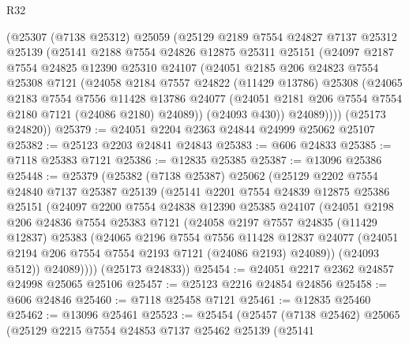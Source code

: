 \begin{lexlean}{R32}
\begin{coremodule}
    (@25307
      (@7138 @25312)
      @25059
      (@25129
        @2189
        @7554
        @24827
        @7137
        @25312
        @25139
        (@25141
          @2188
          @7554
          @24826
          @12875
          @25311
          @25151
          (@24097
            @2187
            @7554
            @24825
            @12390
            @25310
            @24107
            (@24051
              @2185
              @206
              @24823
              @7554
              @25308
              @7121
              (@24058
                @2184
                @7557
                @24822
                (@11429 @13786)
                @25308
                (@24065
                  @2183
                  @7554
                  @7556
                  @11428
                  @13786
                  @24077
                  (@24051 @2181 @206 @7554 @7554 @2180 @7121 (@24086 @2180) @24089))
                (@24093 @430))
              @24089))))
      (@25173 @24820))
@25379 := @24051 @2204 @2363 @24844 @24999 @25062 @25107
@25382 := @25123 @2203 @24841 @24843
@25383 := @606 @24833
@25385 := @7118 @25383 @7121
@25386 := @12835 @25385
@25387 := @13096 @25386
@25448 := @25379
    (@25382
      (@7138 @25387)
      @25062
      (@25129
        @2202
        @7554
        @24840
        @7137
        @25387
        @25139
        (@25141
          @2201
          @7554
          @24839
          @12875
          @25386
          @25151
          (@24097
            @2200
            @7554
            @24838
            @12390
            @25385
            @24107
            (@24051
              @2198
              @206
              @24836
              @7554
              @25383
              @7121
              (@24058
                @2197
                @7557
                @24835
                (@11429 @12837)
                @25383
                (@24065
                  @2196
                  @7554
                  @7556
                  @11428
                  @12837
                  @24077
                  (@24051 @2194 @206 @7554 @7554 @2193 @7121 (@24086 @2193) @24089))
                (@24093 @512))
              @24089))))
      (@25173 @24833))
@25454 := @24051 @2217 @2362 @24857 @24998 @25065 @25106
@25457 := @25123 @2216 @24854 @24856
@25458 := @606 @24846
@25460 := @7118 @25458 @7121
@25461 := @12835 @25460
@25462 := @13096 @25461
@25523 := @25454
    (@25457
      (@7138 @25462)
      @25065
      (@25129
        @2215
        @7554
        @24853
        @7137
        @25462
        @25139
        (@25141

\end{coremodule}
\end{lexlean}
